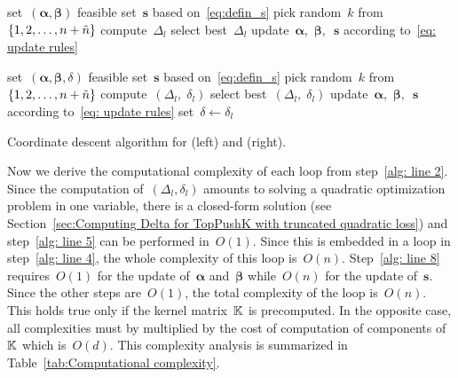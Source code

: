 \begin{algorithm*}[!ht]
  \begin{minipage}{0.48\textwidth}
    \centering
    \begin{algorithmic}[1]
      \State set~$(\bm{\alpha}, \bm{\beta})$ feasible
      \State set~$\bm{s}$ based on~\eqref{eq:defin_s} \label{alg: line 1}
      \Repeat \label{alg: line 2}
        \State pick random~$k$ from~$\{1, 2, \ldots, n + \tilde{n} \}$ \label{alg: line 3}
         \label{alg: line 4}
            \State compute~$\Delta_{l}$  \label{alg: line 5}
        \EndFor
        \State select best~$\Delta_{l}$ \label{alg: line 7}
        \State update~$\bm{\alpha}$,~$\bm{\beta},$~$\bm{s}$ according to~\eqref{eq: update rules} \label{alg: line 8}
        \State \label{alg: line 9}
    \end{algorithmic}
  \end{minipage}
  \hfill
  \begin{minipage}{0.51\textwidth}
    \centering
    \begin{algorithmic}[1]
      \State set~$(\bm{\alpha}, \bm{\beta}, \delta)$ feasible
      \State set~$\bm{s}$ based on~\eqref{eq:defin_s}
      \Repeat
        \State pick random~$k$ from~$\{1, 2, \ldots, n + \tilde{n} \}$ 
            \State compute~$(\Delta_{l}, \; \delta_{l})$
        \EndFor
        \State select best~$(\Delta_{l}, \; \delta_{l})$
        \State update~$\bm{\alpha}$,~$\bm{\beta},$~$\bm{s}$ according to~\eqref{eq: update rules}
        \State set~$\delta \leftarrow \delta_{l}$
    \end{algorithmic}
  \end{minipage}
  \caption{Coordinate descent algorithm for \TopPushK (left) and \PatMat (right).}
  \label{alg:Coordinate descent}
\end{algorithm*}

Now we derive the computational complexity of each \repeatloop loop from step~\ref{alg: line 2}. Since the computation of~$(\Delta_l,\delta_l)$ amounts to solving a quadratic optimization problem in one variable, there is a closed-form solution (see Section~\ref{sec:Computing Delta for TopPushK with truncated quadratic loss}) and step~\ref{alg: line 5} can be performed in~$O(1)$. Since this is embedded in a \forloop loop in step~\ref{alg: line 4}, the whole complexity of this loop is~$O(n)$. Step~\ref{alg: line 8} requires~$O(1)$ for the update of~$\bm{\alpha}$ and~$\bm{\beta}$ while~$O(n)$ for the update of~$\bm s$. Since the other steps are~$O(1)$, the total complexity of the \repeatloop loop is~$O(n)$. This holds true only if the kernel matrix~$\mathbb{K}$ is precomputed. In the opposite case, all complexities must by multiplied by the cost of computation of components of~$\mathbb{K}$ which is~$O(d)$. This complexity analysis is summarized in Table~\ref{tab:Computational complexity}. 


